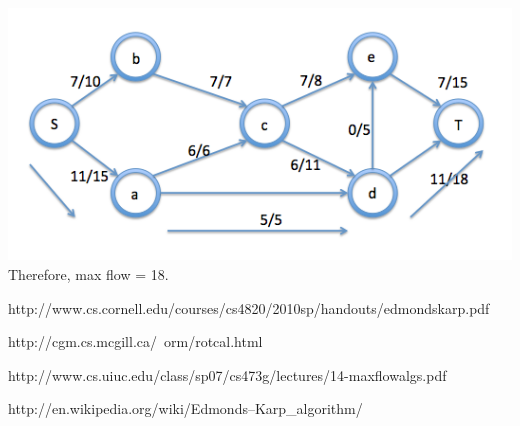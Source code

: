 \documentclass{article}
\begin{document}
\includegraphics[width=\linewidth]{images/4}
Therefore, max flow = 18.
\begin{thebibliography}{9}

http://www.cs.cornell.edu/courses/cs4820/2010sp/handouts/edmondskarp.pdf

http://cgm.cs.mcgill.ca/~orm/rotcal.html

http://www.cs.uiuc.edu/class/sp07/cs473g/lectures/14-maxflowalgs.pdf

http://en.wikipedia.org/wiki/Edmonds–Karp\_algorithm/


\end{thebibliography}
\end{document}
